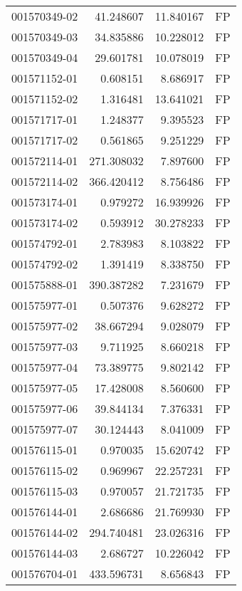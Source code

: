 \begin{tabular}{lrrl}
001570349-02 &   41.248607 &      11.840167 &   FP \\
001570349-03 &   34.835886 &      10.228012 &   FP \\
001570349-04 &   29.601781 &      10.078019 &   FP \\
001571152-01 &    0.608151 &       8.686917 &   FP \\
001571152-02 &    1.316481 &      13.641021 &   FP \\
001571717-01 &    1.248377 &       9.395523 &   FP \\
001571717-02 &    0.561865 &       9.251229 &   FP \\
001572114-01 &  271.308032 &       7.897600 &   FP \\
001572114-02 &  366.420412 &       8.756486 &   FP \\
001573174-01 &    0.979272 &      16.939926 &   FP \\
001573174-02 &    0.593912 &      30.278233 &   FP \\
001574792-01 &    2.783983 &       8.103822 &   FP \\
001574792-02 &    1.391419 &       8.338750 &   FP \\
001575888-01 &  390.387282 &       7.231679 &   FP \\
001575977-01 &    0.507376 &       9.628272 &   FP \\
001575977-02 &   38.667294 &       9.028079 &   FP \\
001575977-03 &    9.711925 &       8.660218 &   FP \\
001575977-04 &   73.389775 &       9.802142 &   FP \\
001575977-05 &   17.428008 &       8.560600 &   FP \\
001575977-06 &   39.844134 &       7.376331 &   FP \\
001575977-07 &   30.124443 &       8.041009 &   FP \\
001576115-01 &    0.970035 &      15.620742 &   FP \\
001576115-02 &    0.969967 &      22.257231 &   FP \\
001576115-03 &    0.970057 &      21.721735 &   FP \\
001576144-01 &    2.686686 &      21.769930 &   FP \\
001576144-02 &  294.740481 &      23.026316 &   FP \\
001576144-03 &    2.686727 &      10.226042 &   FP \\
001576704-01 &  433.596731 &       8.656843 &   FP \\

\end{tabular}
